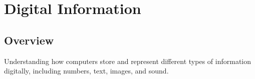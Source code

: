 \chapter{Digital Information}

\section*{Overview}
Understanding how computers store and represent different types of information digitally, including numbers, text, images, and sound.

